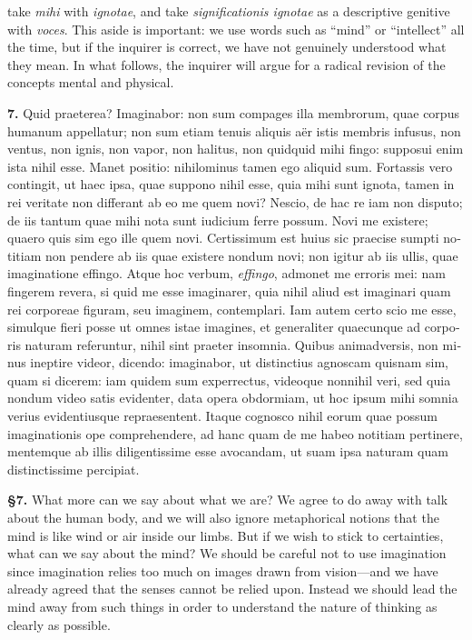  take \textit{mihi} with \textit{ignotae}, and take \textit{significationis ignotae} as a descriptive genitive with \textit{voces}. This aside is important: we use words such as ``mind'' or ``intellect'' all the time, but if the inquirer is correct, we have not genuinely understood what they mean. In what follows, the inquirer will argue for a radical revision of the concepts mental and physical.

\clearpage

\beginnumbering
\pstart
\begin{latin}
    \textenglish{\textbf{7.}} Quid praeterea? Imaginabor: non sum compages illa membrorum, quae corpus humanum appellatur; non sum etiam tenuis aliquis aër istis membris infusus, non ventus, non ignis, non vapor, non halitus, non quidquid mihi fingo: supposui enim ista nihil esse. Manet positio: nihilominus tamen ego aliquid sum. Fortassis vero contingit, ut haec ipsa, quae suppono nihil esse, quia mihi sunt ignota, tamen in rei veritate non differant ab eo me quem novi? Nescio, de hac re iam non disputo; de iis tantum quae mihi nota sunt iudicium ferre possum. Novi me existere; quaero quis sim ego ille quem novi. Certissimum est huius sic praecise sumpti notitiam non pendere ab iis quae existere nondum novi; non igitur ab iis ullis, quae imaginatione effingo. Atque hoc verbum, \textit{effingo}, admonet me erroris mei: nam fingerem revera, si quid me esse imaginarer, quia nihil aliud est imaginari quam rei corporeae figuram, seu imaginem, contemplari. Iam autem certo scio me esse, simulque fieri posse ut omnes istae imagines, et generaliter quaecunque ad corporis naturam referuntur, nihil sint praeter insomnia. Quibus animadversis, non minus ineptire videor, dicendo: imaginabor, ut distinctius agnoscam quisnam sim, quam si dicerem: iam quidem sum experrectus, videoque nonnihil veri, sed quia nondum video satis evidenter, data opera obdormiam, ut hoc ipsum mihi somnia verius evidentiusque repraesentent. Itaque cognosco nihil eorum quae possum imaginationis ope comprehendere, ad hanc quam de me habeo notitiam pertinere, mentemque ab illis diligentissime esse avocandam, ut suam ipsa naturam quam distinctissime percipiat.
\end{latin}
\pend
\endnumbering

\prenotes

\textbf{§7.} What more can we say about what we are? We agree to do away with talk about the human body, and we will also ignore metaphorical notions that the mind is like wind or air inside our limbs. But if we wish to stick to certainties, what can we say about the mind? We should be careful not to use imagination since imagination relies too much on images drawn from vision---and we have already agreed that the senses cannot be relied upon. Instead we should lead the mind away from such things in order to understand the nature of thinking as clearly as possible.

